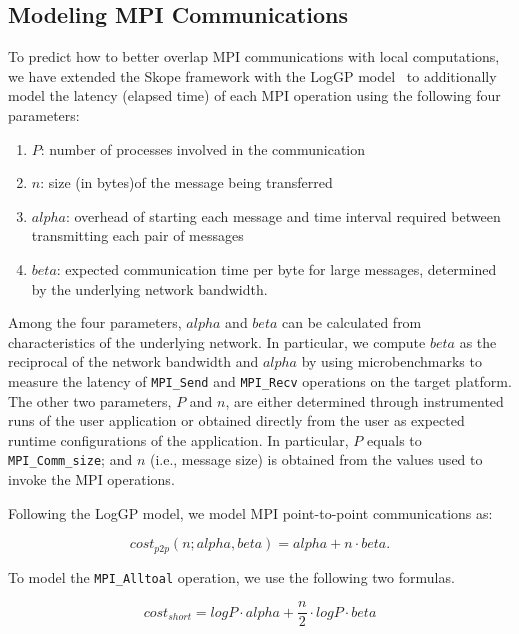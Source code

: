 \subsection{Modeling MPI Communications}

To predict how to better overlap MPI communications with local
computations, we have extended the Skope framework with the LogGP
model~\cite{loggp} to additionally model the latency (elapsed time) of
each MPI operation using the following four parameters:

\begin{enumerate}

\item $P$: number of processes involved in the communication

\item $n$: size (in bytes)of the message being transferred

\item $alpha$: overhead of starting each message and time interval
  required between transmitting each pair of messages

\item $beta$: expected communication time per byte for large messages,
  determined by the underlying network bandwidth.

\end{enumerate}

Among the four parameters, $alpha$ and $beta$ can be calculated from
characteristics of the underlying network.  In particular, we compute
$beta$ as the reciprocal of the network bandwidth and $alpha$ by using
microbenchmarks to measure the latency of \texttt{MPI\_Send} and
\texttt{MPI\_Recv} operations on the target platform.  The other two
parameters, $P$ and $n$, are either determined through instrumented
runs of the user application or obtained directly from the user as
expected runtime configurations of the application.  In particular,
$P$ equals to \texttt{MPI\_Comm\_size}; and $n$ (i.e., message size)
is obtained from the values used to invoke the MPI operations.

Following the LogGP model, we model MPI point-to-point communications
as:

\begin{equation}
cost_{p2p}(n;alpha,beta) = alpha + n\cdot beta .
\end{equation}

To model the \texttt{MPI\_Alltoal} operation, we use the following two
formulas.

\begin{equation}
  cost_{short} = log P\cdot alpha + \frac{n}{2}\cdot log P\cdot beta
\end{equation}

